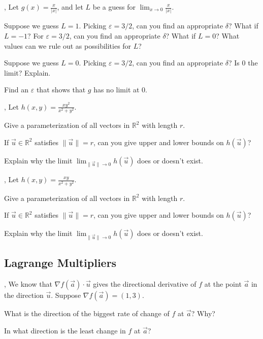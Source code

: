 \documentclass[letter]{article}
\newcommand{\R}{\mathbb{R}}
\begin{document}
	\sep
	Let $g(x) = \frac{x}{|x|}$, and let $L$ be a guess for $\lim_{x\to 0} \frac{x}{|x|}$.
	\begin{Enum}
		\item Suppose we guess $L=1$.  Picking $\varepsilon = 3/2$, can you find an appropriate
			$\delta$?  What if $L=-1$?  For $\varepsilon=3/2$, can you find an appropriate $\delta$?
			What if $L=0$?  What values can we rule out as possibilities for $L$?
		\item Suppose we guess $L=0$.  Picking $\varepsilon=3/2$, can you find an appropriate $\delta$?
			Is $0$ the limit?  Explain.
		\item Find an $\varepsilon$ that shows that $g$ has no limit at $0$.
	\end{Enum}

	\sep
	Let $h(x,y) = \frac{xy^2}{x^2+y^2}$.
	\begin{Enum}
		\item Give a parameterization of all vectors in $\R^2$ with length $r$.
		\item If $\vec u\in \R^2$ satisfies $\|\vec u\|=r$, can you give upper
			and lower bounds on $h(\vec u)$?
		\item Explain why the limit $\displaystyle \lim_{\|\vec u\|\to 0} h(\vec u)$
			does or doesn't exist.
	\end{Enum}
	\sep
	Let $h(x,y) = \frac{xy}{x^2+y^2}$.
	\begin{Enum}
		\item Give a parameterization of all vectors in $\R^2$ with length $r$.
		\item If $\vec u\in \R^2$ satisfies $\|\vec u\|=r$, can you give upper
			and lower bounds on $h(\vec u)$?
		\item Explain why the limit $\displaystyle \lim_{\|\vec u\|\to 0} h(\vec u)$
			does or doesn't exist.
	\end{Enum}


\newpage
\subsection*{Lagrange Multipliers}

	\sep
	We know that $\nabla f(\vec a)\cdot \vec u$ gives the directional derivative
	of $f$ at the point $\vec a$ in the direction $\vec u$.  Suppose
	$\nabla f(\vec a) = (1,3)$.
	\begin{Enum}
		\item What is the direction of the biggest rate of change of $f$ at $\vec a$? Why?
		\item In what direction is the least change in $f$ at $\vec a$?
	\end{Enum}
\end{document}
